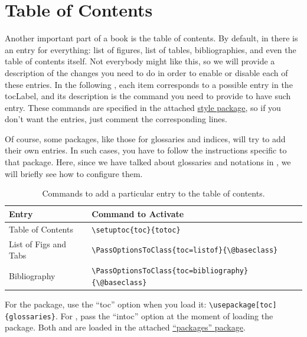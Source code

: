 \section{Table of Contents}

Another important part of a book is the table of contents. By default, 
in  there is an entry for everything: list of figures, 
list of tables, bibliographies, and even the table of contents itself. 
Not everybody might like this, so we will provide a description of the 
changes you need to do in order to enable or disable each of these 
entries. In the following , each item corresponds to 
a possible entry in the \acrshort{tocLabel}, and its description is the 
command you need to provide to have such entry. These commands are 
specified in the attached \href{style/style.sty}{style 
package}, so if you don't want the entries, just comment the 
corresponding lines.

Of course, some packages, like those for glossaries and indices, will 
try to add their own entries. In such cases, you have to follow the 
instructions specific to that package. Here, since we have talked about 
glossaries and notations in , we will briefly see how
to configure them.

\begin{table}
\footnotesize
\caption[TOC entry commands]{Commands to add a particular entry to the table of contents.}
\begin{tabular}{ l l }
	\toprule
	Entry & Command to Activate \\
	\midrule
	Table of Contents & \lstinline|\setuptoc{toc}{totoc}| \\
	List of Figs and Tabs & \lstinline|\PassOptionsToClass{toc=listof}{\@baseclass}| \\
	Bibliography & \lstinline|\PassOptionsToClass{toc=bibliography}{\@baseclass}| \\
	\bottomrule
\end{tabular}
\end{table}

For the  package, use the \enquote{toc} option when 
you load it: \lstinline|\usepackage[toc]{glossaries}|. For 
, pass the \enquote{intoc} option at the moment of 
loading the package. Both  and  are 
loaded in the attached \href{style/packages.sty}{\enquote{packages} 
package}.

